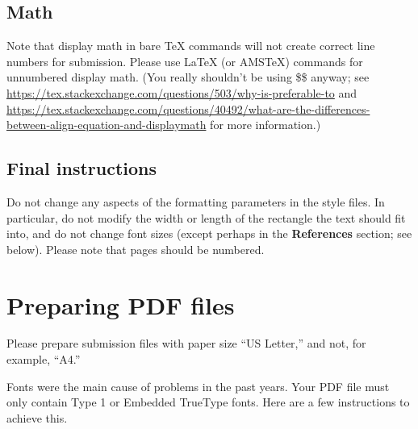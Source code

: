 \documentclass{article}
\begin{document}
	\subsection{Math}
	Note that display math in bare TeX commands will not create correct line numbers for submission. Please use LaTeX (or AMSTeX) commands for unnumbered display math. (You really shouldn't be using \$\$ anyway; see \url{https://tex.stackexchange.com/questions/503/why-is-preferable-to} and \url{https://tex.stackexchange.com/questions/40492/what-are-the-differences-between-align-equation-and-displaymath} for more information.)
	
	\subsection{Final instructions}
	
	Do not change any aspects of the formatting parameters in the style files.  In
	particular, do not modify the width or length of the rectangle the text should
	fit into, and do not change font sizes (except perhaps in the
	\textbf{References} section; see below). Please note that pages should be
	numbered.
	
	
	\section{Preparing PDF files}
	
	
	Please prepare submission files with paper size ``US Letter,'' and not, for
	example, ``A4.''
	
	
	Fonts were the main cause of problems in the past years. Your PDF file must only
	contain Type 1 or Embedded TrueType fonts. Here are a few instructions to
	achieve this.
	
\end{document}
